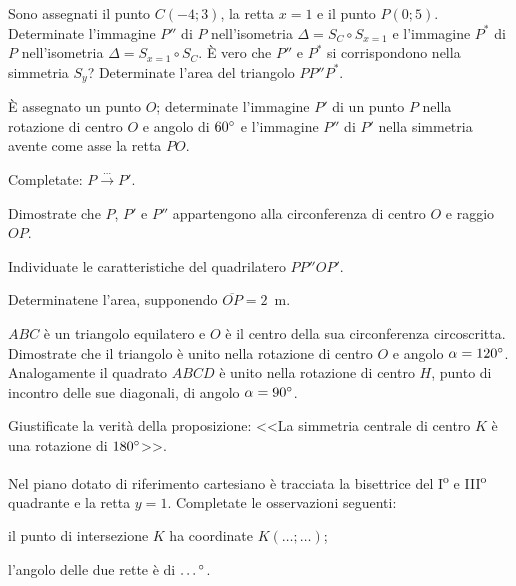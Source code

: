 \begin{esercizio}
\label{ese:8.65} %
Sono assegnati il punto $C(-4;3)$, la retta $x=1$ e il punto $P(0;5)$. Determinate l'immagine $P''$ di $P$ nell'isometria $\Delta=S_{C}\circ S_{x=1}$ e l'immagine $P^*$ di $P$ nell'isometria $\Delta=S_{x=1}\circ S_{C}$. \`E vero che $P''$ e $P^*$ si corrispondono nella simmetria $S_y$? Determinate l'area del triangolo $PP''P^*$.
\end{esercizio}

\begin{esercizio}
\label{ese:8.66} %
\`E assegnato un punto $O$; determinate l'immagine $P'$ di un punto $P$ nella rotazione di centro $O$ e angolo di $60{}^{\circ}$ e l'immagine $P''$ di $P'$ nella simmetria avente come asse la retta $PO$.
\begin{enumeratea}
\item Completate: $P \overset{\ldots{}}\longrightarrow P'$. 
\item Dimostrate che $P$, $P'$ e $P''$ appartengono alla circonferenza di centro $O$ e raggio $OP$.
\item Individuate le caratteristiche del quadrilatero $PP''OP'$.
\item Determinatene l'area, supponendo $\overline{OP}=2$~m.
\end{enumeratea}
\end{esercizio}

\begin{esercizio}
\label{ese:8.67} %
$ABC$ è un triangolo equilatero e $O$ è il centro della sua circonferenza circoscritta. Dimostrate che il triangolo è unito nella rotazione di centro $O$ e angolo $\alpha=120{}^{\circ}$. Analogamente il quadrato $ABCD$ è unito nella rotazione di centro $H$, punto di incontro delle sue diagonali, di angolo $\alpha=90{}^{\circ}$.
\end{esercizio}

\begin{esercizio}
\label{ese:8.68} %
Giustificate la verità della proposizione: <<La simmetria centrale di centro $K$ è una rotazione di $180{}^{\circ}$>>.
\end{esercizio}

\begin{esercizio}
\label{ese:8.69} %
Nel piano dotato di riferimento cartesiano è tracciata la bisettrice del I\textsuperscript{o} e III\textsuperscript{o} quadrante e la retta $y=1$. Completate le osservazioni seguenti:
\begin{enumeratea}
\item il punto di intersezione $K$ ha coordinate $K(\ldots{};\ldots{})$;
\item l'angolo delle due rette è di $\ldots{}{}^{\circ}$.
\end{enumeratea}
\end{esercizio}

